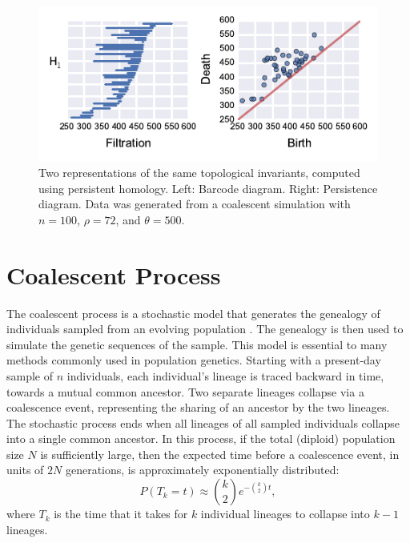 \begin{figure}
\begin{center}
\centerline{\includegraphics[width=\columnwidth]{./fig/persistence_diagram.pdf}}
\caption[Two representations of the same topological invariants computed using persistent homology]{Two representations of the same topological invariants, computed using persistent homology. Left: Barcode diagram. Right: Persistence diagram. Data was generated from a coalescent simulation with $n=100$, $\rho=72$, and $\theta=500$.}
\label{fig:persistence_diagram}
\end{center}
\end{figure}

\section{Coalescent Process}

The coalescent process is a stochastic model that generates the genealogy of individuals sampled from an evolving population \cite{Wakeley:2009}.
The genealogy is then used to simulate the genetic sequences of the sample.
This model is essential to many methods commonly used in population genetics.
Starting with a present-day sample of $n$ individuals, each individual's lineage is traced backward in time, towards a mutual common ancestor.
Two separate lineages collapse via a coalescence event, representing the sharing of an ancestor by the two lineages.
The stochastic process ends when all lineages of all sampled individuals collapse into a single common ancestor.
In this process, if the total (diploid) population size $N$ is sufficiently large, then the expected time before a coalescence event, in units of $2N$ generations, is approximately exponentially distributed:
\begin{equation}
P(T_{k}=t) \approx \binom{k}{2} e ^{-\binom{k}{2} t},
\end{equation}
where $T_k$ is the time that it takes for $k$ individual lineages to collapse into $k-1$ lineages.


